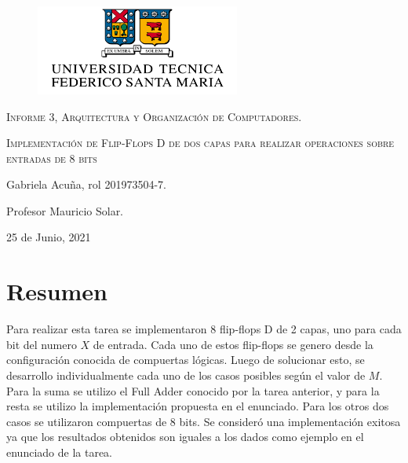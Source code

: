 \documentclass[12pt]{article}
\begin{document}
\begin{titlepage}
    \centering

    \begin{figure}[ht!]
        \centering
      \includegraphics[keepaspectratio, width=0.6\textwidth]{logoUSM.png}
    \end{figure}
    \vspace{1cm}
    {\scshape\Large Informe 3, Arquitectura y Organización de Computadores. \par}
    \vspace{1cm}
    {\scshape\Huge Implementación de Flip-Flops D de dos capas para realizar operaciones sobre entradas de 8 bits\par}
    \vspace{1.5cm}
    {\Large Gabriela Acuña, rol 201973504-7.\par}
    \vspace{0.2cm}
    {\Large Profesor Mauricio Solar.}
    \vfill
    {\Large  25 de Junio, 2021 \par}

\end{titlepage}

\tableofcontents
\clearpage


\section{Resumen}
Para realizar esta tarea se implementaron 8 flip-flops D de 2 capas, uno para cada bit del numero $X$ de entrada. Cada uno de estos flip-flops se genero desde la configuración conocida de compuertas lógicas. Luego de solucionar esto, se desarrollo individualmente cada uno de los casos posibles según el valor de $M$. Para la suma se utilizo el Full Adder conocido por la tarea anterior, y para la resta se utilizo la implementación propuesta en el enunciado. Para los otros dos casos se utilizaron compuertas de 8 bits. 
 Se consideró una implementación exitosa ya que los resultados obtenidos son iguales a los dados como ejemplo en el enunciado de la tarea. 
\end{document}
